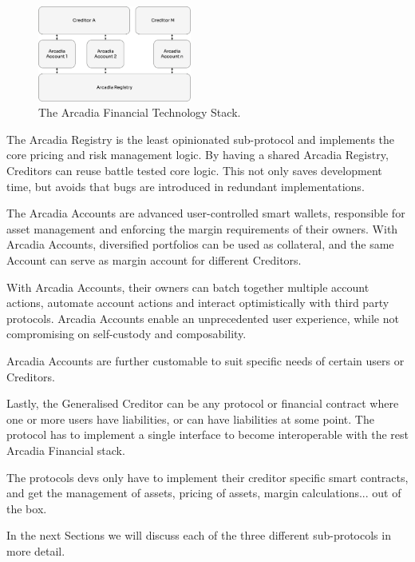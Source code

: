 \documentclass[sigconf,nonacm]{acmart}
\begin{document}
\begin{figure}
    \centering
    \includegraphics[width=0.45\textwidth]{images/Arcadia-Financial-Technology-Stack.png}
    \caption{The Arcadia Financial Technology Stack. \label{fig:arcadia-financial-technology-stack}}
\end{figure}

The Arcadia Registry is the least opinionated sub-protocol and implements the core pricing and risk management logic.
By having a shared Arcadia Registry, Creditors can reuse battle tested core logic.
This not only saves development time, but avoids that bugs are introduced in redundant implementations.

The Arcadia Accounts are advanced user-controlled smart wallets, responsible for asset management and enforcing the margin requirements of their owners.
With Arcadia Accounts, diversified portfolios can be used as collateral, and the same Account can serve as margin account for different Creditors.

With Arcadia Accounts, their owners can batch together multiple account actions, automate account actions and interact optimistically with third party protocols.
Arcadia Accounts enable an unprecedented user experience, while not compromising on self-custody and composability.

Arcadia Accounts are further customable to suit specific needs of certain users or Creditors.

Lastly, the Generalised Creditor can be any protocol or financial contract where one or more users have liabilities, or can have liabilities at some point.
The protocol has to implement a single interface to become interoperable with the rest Arcadia Financial stack.

The protocols devs only have to implement their creditor specific smart contracts,
and get the management of assets, pricing of assets, margin calculations... out of the box.

In the next Sections we will discuss each of the three different sub-protocols in more detail.
\end{document}
